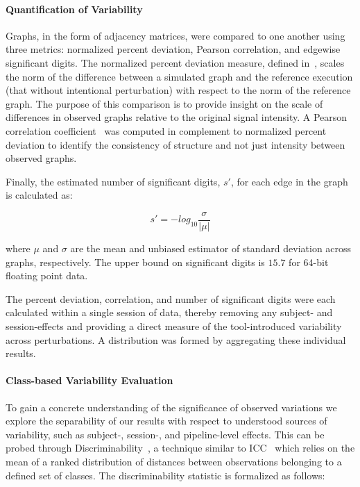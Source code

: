 \documentclass[fleqn,10pt]{SelfArx} %
\begin{document}
\paragraph{Quantification of Variability}
Graphs, in the form of adjacency matrices, were compared to one another using three metrics: normalized percent
deviation, Pearson correlation, and edgewise significant digits. The normalized percent deviation measure, defined
in~\cite{Kiar2020-lb}, scales the norm of the difference between a simulated graph and the reference execution (that
without intentional perturbation) with respect to the norm of the reference graph. The purpose of this comparison is
to provide insight on the scale of differences in observed graphs relative to the original signal intensity. A Pearson
correlation coefficient~\cite{Benesty2009-cb} was computed in complement to normalized percent deviation to identify
the consistency of structure and not just intensity between observed graphs.

Finally, the estimated number of significant digits, $s'$, for each edge in the graph is calculated as:

\begin{equation}
s' = -log_{10}\frac{\sigma}{\lvert\mu\rvert}
\label{eq:sigdig}
\end{equation}

where $\mu$ and $\sigma$ are the mean and unbiased estimator of standard deviation across graphs, respectively. The
upper bound on significant digits is $15.7$ for 64-bit floating point data.

The percent deviation, correlation, and number of significant digits were each calculated within a single session of
data, thereby removing any subject- and session-effects and providing a direct measure of the tool-introduced
variability across perturbations. A distribution was formed by aggregating these individual results.

\paragraph{Class-based Variability Evaluation} To gain a concrete understanding of the significance of observed
variations we explore the separability of our results with respect to understood sources of variability, such as 
subject-, session-, and pipeline-level effects. This can be probed through Discriminability~\cite{bridgeford2020elim},
a technique similar to ICC~\cite{Bartko1966-tl} which relies on the mean of a ranked distribution of distances between
observations belonging to a defined set of classes. The discriminability statistic is formalized as follows:
\end{document}
